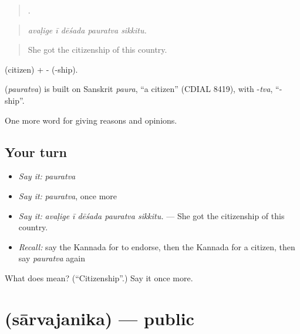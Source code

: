 \begin{quote}
    .
\end{quote}

\begin{quote}
\emph{avaḷige ī dēśada pauratva sikkitu.}
\end{quote}

\begin{quote}
She got the citizenship of this country.
\end{quote}

 (citizen) + - (-ship).

\begin{cousinweb}
\textbf{} (\emph{pauratva}) is built on Sanskrit \emph{paura}, \textquotedblleft{}a citizen\textquotedblright{} (CDIAL 8419), with -\emph{tva}, \textquotedblleft{}-ship\textquotedblright{}.
\end{cousinweb}

\begin{grammarlens}[title={What you've built}]
One more word for giving reasons and opinions.
\end{grammarlens}

\subsection*{Your turn}
\begin{itemize}
\raggedright
  \item \emph{Say it:} \emph{pauratva}
  \item \emph{Say it:} \emph{pauratva}, once more
  \item \emph{Say it:} \emph{avaḷige ī dēśada pauratva sikkitu.} — She got the citizenship of this country.
  \item \emph{Recall:} say the Kannada for to endorse, then the Kannada for a citizen, then say \emph{pauratva} again
\end{itemize}

\begin{tcolorbox}[breakable,colback=teal!4,colframe=teal!35!black,title={Before you move on}]
What does  mean? (\textquotedblleft{}Citizenship\textquotedblright{}.) Say it once more.
\end{tcolorbox}
\section[\texorpdfstring{\kn{ಸಾರ್ವಜನಿಕ} (sārvajanika)}{ಸಾರ್ವಜನಿಕ (sārvajanika)}]{ (sārvajanika) — public}

